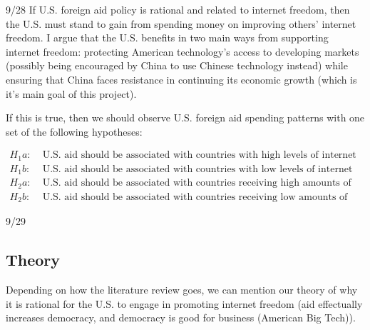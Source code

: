9/28
If U.S. foreign aid policy is rational and related to internet freedom, then the U.S. must stand to gain from spending money on improving others' internet freedom. I argue that the U.S. benefits in two main ways from supporting internet freedom: protecting American technology's access to developing markets (possibly being encouraged by China to use Chinese technology instead) while ensuring that China faces resistance in continuing its economic growth (which is it's main goal of this project).

If this is true, then we should observe U.S. foreign aid spending patterns with one set of the following hypotheses:

\begin{align*}
    H_1a:\; & \text{U.S. aid should be associated with countries with high levels of internet freedom.}\\
    H_1b:\; & \text{U.S. aid should be associated with countries with low levels of internet freedom.}\\
    H_2a:\; & \text{U.S. aid should be associated with countries receiving high amounts of Chinese aid.}\\
    H_2b:\; & \text{U.S. aid should be associated with countries receiving low amounts of Chinese aid.}
\end{align*}

9/29
\subsection*{Theory}
Depending on how the literature review goes, we can mention our theory of why it is rational for the U.S. to engage in promoting internet freedom (aid effectually increases democracy, and democracy is good for business (American Big Tech)).
